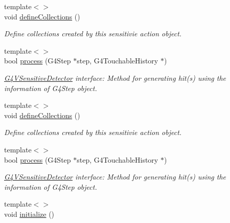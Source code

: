 \begin{DoxyCompactItemize}
{\footnotesize template$<$$>$ }\\void \hyperlink{class_d_d4hep_1_1_simulation_1_1_geant4_sensitive_action_a6fec266f731814c2fb5aa21646032690}{defineCollections} ()
\begin{DoxyCompactList}\small\item\em Define collections created by this sensitivie action object. \item\end{DoxyCompactList}\item 
{\footnotesize template$<$$>$ }\\bool \hyperlink{class_d_d4hep_1_1_simulation_1_1_geant4_sensitive_action_a085a617b35c067ca4b29ba4093d976d6}{process} (G4Step $\ast$step, G4TouchableHistory $\ast$)
\begin{DoxyCompactList}\small\item\em \hyperlink{class_g4_v_sensitive_detector}{G4VSensitiveDetector} interface: Method for generating hit(s) using the information of G4Step object. \item\end{DoxyCompactList}\item 
{\footnotesize template$<$$>$ }\\void \hyperlink{class_d_d4hep_1_1_simulation_1_1_geant4_sensitive_action_a76b62dc60cda1378d90d578c247705d8}{defineCollections} ()
\begin{DoxyCompactList}\small\item\em Define collections created by this sensitivie action object. \item\end{DoxyCompactList}\item 
{\footnotesize template$<$$>$ }\\bool \hyperlink{class_d_d4hep_1_1_simulation_1_1_geant4_sensitive_action_a1828a968de6f07ff11e5b53f23593c3c}{process} (G4Step $\ast$step, G4TouchableHistory $\ast$)
\begin{DoxyCompactList}\small\item\em \hyperlink{class_g4_v_sensitive_detector}{G4VSensitiveDetector} interface: Method for generating hit(s) using the information of G4Step object. \item\end{DoxyCompactList}\item 
{\footnotesize template$<$$>$ }\\void \hyperlink{class_d_d4hep_1_1_simulation_1_1_geant4_sensitive_action_a031c0b9cb9de513bc845012042fc7825}{initialize} ()
\item 

\end{DoxyCompactItemize}
